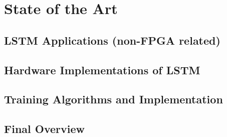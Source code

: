 \chapter{State of the Art}\label{chap:stateArt}


\section{LSTM Applications (non-FPGA related)} 

\section{Hardware Implementations of LSTM}

\section{Training Algorithms and Implementation}

\section{Final Overview}
